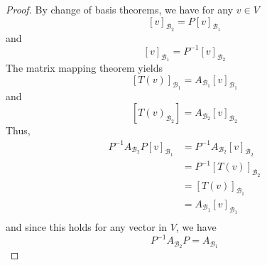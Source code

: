 \documentclass{article}
\begin{document}
\begin{proof}
  By change of basis theorems, we have for any $v \in V$ \[
    [v]_{\mathcal{B}_2} = P[v]_{\mathcal{B}_1}
  \] and \[
    [v]_{\mathcal{B}_1} = P^{-1}[v]_{\mathcal{B}_2}
  \]
  The matrix mapping theorem yields \[
    [T(v)]_{\mathcal{B}_1} = A_{\mathcal{B}_1}[v]_{\mathcal{B}_1}
  \] and \[
    [T(v)_{\mathcal{B}_2}] = A_{\mathcal{B}_2}[v]_{\mathcal{B}_2}
  \]
  Thus,
  \begin{align*}
    P^{-1}A_{\mathcal{B}_2}P[v]_{\mathcal{B}_1} & = P^{-1}A_{\mathcal{B}_2}[v]_{\mathcal{B}_2} \\
                                                & = P^{-1}[T(v)]_{\mathcal{B}_2}               \\
                                                & = [T(v)]_{\mathcal{B}_1}                     \\
                                                & = A_{\mathcal{B}_1}[v]_{\mathcal{B}_1}       \\
  \end{align*} and since this holds for any vector in $V$, we have \[
    P^{-1}A_{\mathcal{B}_2}P = A_{\mathcal{B}_1}
  \]
\end{proof}
\end{document}

